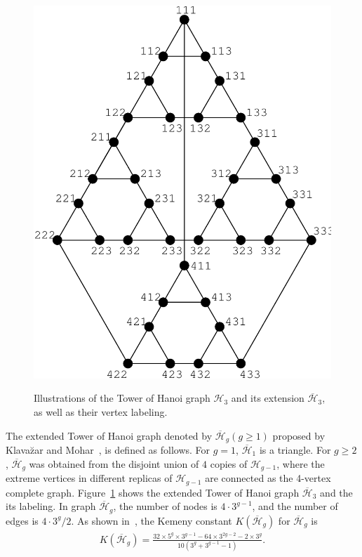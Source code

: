 \documentclass[10pt,journal,compsoc,twocolumn,twoside]{IEEEtran}
\begin{document}
\begin{figure}[!t]
{\begin{minipage}[t]{0.5\linewidth}
            \includegraphics[width=0.95\linewidth,trim=0 0 0 0]{spsklk.pdf}
            \label{exSierpinski}
        \end{minipage}%
    }%
    \centering
    \caption{Illustrations of the Tower of Hanoi graph \(\mathcal{H}_{3}\) and its extension \(\overline{\mathcal{H}}_{3}\), as well as  their vertex labeling.}
\end{figure}

The extended  Tower of Hanoi graph denoted by \(\overline{\mathcal{H}}_{g}(g\ge 1)\)  proposed by Klava\u zar and Mohar~\cite{KlMo05}, is defined as follows. For \(g=1\), \(\overline{\mathcal{H}}_{1}\) is a triangle. For \(g\ge2\),  \(\overline{\mathcal{H}}_{g}\) was obtained from the disjoint union of \(4\) copies of \(\mathcal{H}_{g-1}\), where the extreme vertices in different  replicas of \(\mathcal{H}_{g-1}\) are connected as the 4-vertex complete graph. Figure~\ref{exSierpinski} shows the extended  Tower of Hanoi graph \(\overline{\mathcal{H}}_{3}\) and the its labeling. In graph \(\overline{\mathcal{H}}_{g}\), the number of nodes is \(4\cdot3^{g-1}\), and the number of edges is \(4\cdot3^g/2\). As shown in~\cite{QiZh18}, the Kemeny constant \(K(\overline{\mathcal{H}}_{g})\) for \(\overline{\mathcal{H}}_{g}\) is
\begin{align}
    K(\overline{\mathcal{H}}_{g}) = \frac{32\times5^g\times3^{g-1}-64\times3^{2g-2}-2\times3^g}{10(3^g+3^{g-1}-1)}.
    \label{Kg04}
\end{align}
\end{document}
